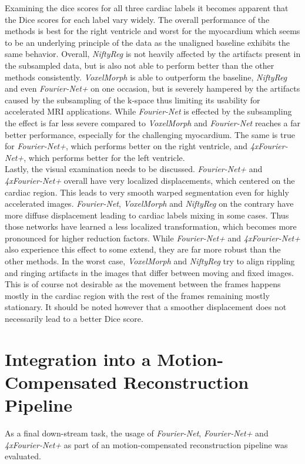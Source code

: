 Examining the dice scores for all three cardiac labels it becomes apparent that the Dice scores for each label vary widely. The overall performance of the methods is best for the right ventricle and worst for the myocardium which seems to be an underlying principle of the data as the unaligned baseline exhibits the same behavior. Overall, \emph{NiftyReg} is not heavily affected by the artifacts present in the subsampled data, but is also not able to perform better than the other methods consistently. \emph{VoxelMorph} is able to outperform the baseline, \emph{NiftyReg} and even \emph{Fourier-Net+} on one occasion, but is severely hampered by the artifacts caused by the subsampling of the k-space thus limiting its usability for accelerated MRI applications. While \emph{Fourier-Net} is effected by the subsampling the effect is far less severe compared to \emph{VoxelMorph} and \emph{Fourier-Net} reaches a far better performance, especially for the challenging myocardium. The same is true for \emph{Fourier-Net+}, which performs better on the right ventricle, and \emph{4xFourier-Net+}, which performs better for the left ventricle.\\
Lastly, the visual examination needs to be discussed. \emph{Fourier-Net+} and \emph{4xFourier-Net+} overall have very localized displacements, which centered on the cardiac region. This leads to very smooth warped segmentation even for highly accelerated images.
\emph{Fourier-Net}, \emph{VoxelMorph} and \emph{NiftyReg} on the contrary have more diffuse displacement leading to cardiac labels mixing in some cases. Thus those networks have learned a less localized transformation, which becomes more pronounced for higher reduction factors. While \emph{Fourier-Net+} and \emph{4xFourier-Net+} also experience this effect to some extend, they are far more robust than the other methods. In the worst case, \emph{VoxelMorph} and \emph{NiftyReg} try to align rippling and ringing artifacts in the images that differ between moving and fixed images. This is of course not desirable as the movement between the frames happens mostly in the cardiac region with the rest of the frames remaining mostly stationary. It should be noted however that a smoother displacement does not necessarily lead to a better Dice score. 


\section{Integration into a Motion-Compensated Reconstruction Pipeline} \label{Sec:DiscussionIntegrationMotion-CompensatedReconstructionPipeline}
As a final down-stream task, the usage of \emph{Fourier-Net}, \emph{Fourier-Net+} and \emph{4xFourier-Net+} as part of an motion-compensated reconstruction pipeline was evaluated.

